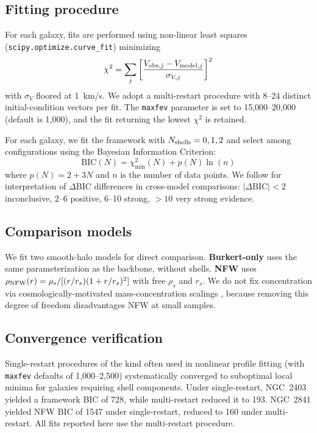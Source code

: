 \subsection{Fitting procedure}
\label{sec:fitting}

For each galaxy, fits are performed using non-linear least squares (\texttt{scipy.optimize.curve\_fit}) minimizing
\begin{equation}
\chi^2 = \sum_j \left[\frac{V_{{\rm obs},j} - V_{{\rm model},j}}{\sigma_{V,j}}\right]^2
\end{equation}
with $\sigma_V$ floored at 1~km/s. We adopt a multi-restart procedure with 8--24 distinct initial-condition vectors per fit. The \texttt{maxfev} parameter is set to 15{,}000--20{,}000 (default is 1{,}000), and the fit returning the lowest $\chi^2$ is retained.

For each galaxy, we fit the framework with $N_{\rm shells} = 0, 1, 2$ and select among configurations using the Bayesian Information Criterion:
\begin{equation}
\mathrm{BIC}(N) = \chi^2_{\min}(N) + p(N) \ln(n)
\end{equation}
where $p(N) = 2 + 3N$ and $n$ is the number of data points. We follow \citet{KassRaftery1995} for interpretation of $\Delta\mathrm{BIC}$ differences in cross-model comparisons: $|\Delta\mathrm{BIC}| < 2$ inconclusive, 2--6 positive, 6--10 strong, $>10$ very strong evidence.

\subsection{Comparison models}
\label{sec:comparison}

We fit two smooth-halo models for direct comparison. \textbf{Burkert-only} uses the same parameterization as the backbone, without shells. \textbf{NFW} \citep{NFW1996,NFW1997} uses $\rho_{\rm NFW}(r) = \rho_s / [(r/r_s)(1 + r/r_s)^2]$ with free $\rho_s$ and $r_s$. We do not fix concentration via cosmologically-motivated mass-concentration scalings \citep[e.g.,][]{DuttonMaccio2014}, because removing this degree of freedom disadvantages NFW at small samples.

\subsection{Convergence verification}

Single-restart procedures of the kind often used in nonlinear profile fitting (with \texttt{maxfev} defaults of 1{,}000--2{,}500) systematically converged to suboptimal local minima for galaxies requiring shell components. Under single-restart, NGC~2403 yielded a framework BIC of 728, while multi-restart reduced it to 193. NGC~2841 yielded NFW BIC of 1547 under single-restart, reduced to 160 under multi-restart. All fits reported here use the multi-restart procedure.

